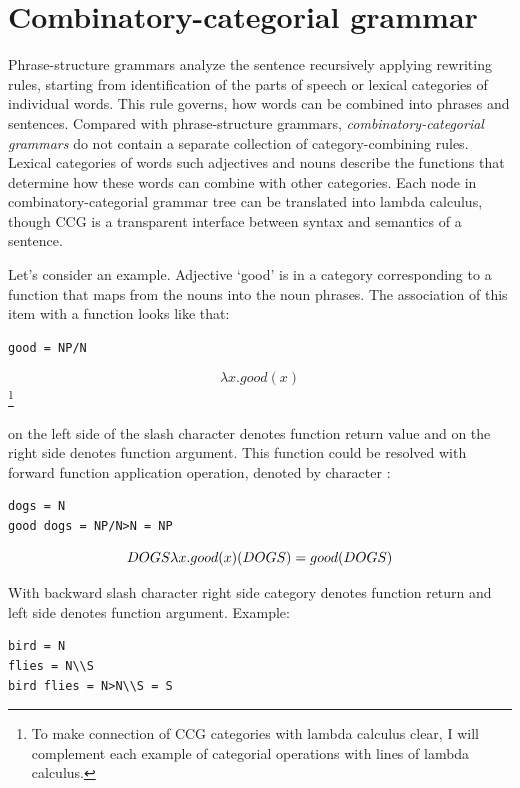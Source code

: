 \section{Combinatory-categorial grammar}

Phrase-structure grammars analyze the sentence recursively applying rewriting rules, starting from identification of the parts of speech or lexical categories of individual words. This rule governs, how words can be combined into phrases and sentences. Compared with phrase-structure grammars, \emph{combinatory-categorial grammars} do not contain a separate collection of category-combining rules. Lexical categories of words such adjectives and nouns describe the functions that determine how these words can combine with other categories. Each node in combinatory-categorial grammar tree can be translated into lambda calculus, though CCG is a transparent interface between syntax and semantics of a sentence. 

Let's consider an example. Adjective ‘good’ is in a category corresponding to a function that maps from the nouns into the noun phrases. The association of this item with a function looks like that:

\begin{verbatim}
good = NP/N 
\end{verbatim}

\[ 
\lambda x.good(x) 
\]\footnote{To make connection of CCG categories with lambda calculus clear, I will complement each example of categorial operations with lines of lambda calculus.}

 on the left side of the slash character denotes function return value and  on the right side denotes function argument. This function could be resolved with forward function application operation, denoted by character \code{>}:

\begin{verbatim}
dogs = N
good dogs = NP/N>N = NP
\end{verbatim}

\[ 
DOGS \\
\lambda x.good(x)(DOGS)=good(DOGS) 
\]

With backward slash character \code{\\} right side category denotes function return and left side denotes function argument. Example:

\begin{verbatim}
bird = N
flies = N\\S
bird flies = N>N\\S = S
\end{verbatim}

